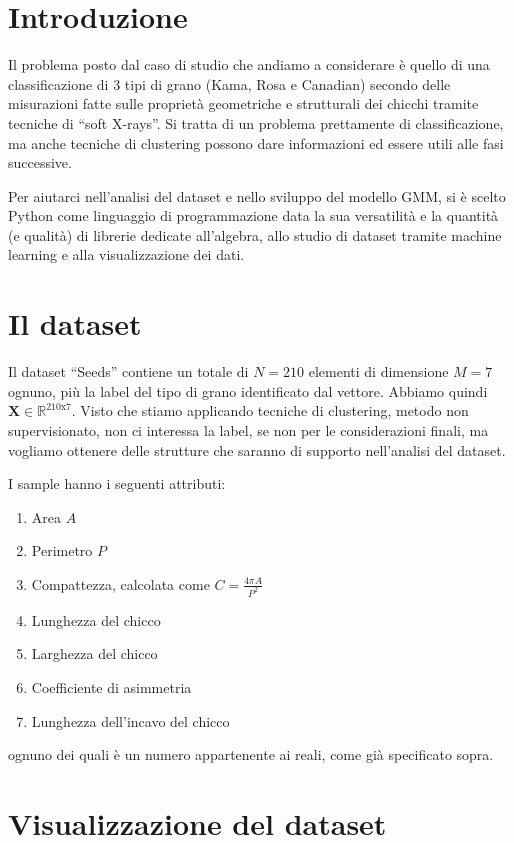 \documentclass{report}
\begin{document}
\section{Introduzione}\label{introduzione}

Il problema posto dal caso di studio che andiamo a considerare è quello
di una classificazione di 3 tipi di grano (Kama, Rosa e Canadian)
secondo delle misurazioni fatte sulle proprietà geometriche e
strutturali dei chicchi tramite tecniche di ``soft X-rays''. Si
tratta di un problema prettamente di classificazione, ma anche tecniche
di clustering possono dare informazioni ed essere utili alle fasi
successive.

Per aiutarci nell'analisi del dataset e nello sviluppo del modello GMM,
si è scelto Python come linguaggio di programmazione data la sua
versatilità e la quantità (e qualità) di librerie dedicate all'algebra,
allo studio di dataset tramite machine learning e alla visualizzazione
dei dati.

\section{Il dataset}\label{il-dataset}

Il dataset ``Seeds'' contiene un totale di \(N=210\) elementi di
dimensione \(M=7\) ognuno, più la label del tipo di grano identificato
dal vettore. Abbiamo quindi
\(\boldsymbol{X}\in\mathbb{R}^{210\text{x}7}\). Visto che stiamo
applicando tecniche di clustering, metodo non supervisionato, non ci
interessa la label, se non per le considerazioni finali, ma vogliamo
ottenere delle strutture che saranno di supporto nell'analisi del
dataset.

I sample hanno i seguenti attributi:
\begin{enumerate}
\item Area \(A\)
\item Perimetro \(P\)
\item Compattezza, calcolata come \(C = \frac{4\pi A}{P^2}\)
\item Lunghezza del chicco
\item Larghezza del chicco
\item Coefficiente di asimmetria
\item Lunghezza dell'incavo del chicco
\end{enumerate}
ognuno dei quali è un numero appartenente ai reali, come già specificato
sopra.

\section{Visualizzazione del dataset}\label{visualizzazione-del-dataset}
\end{document}
